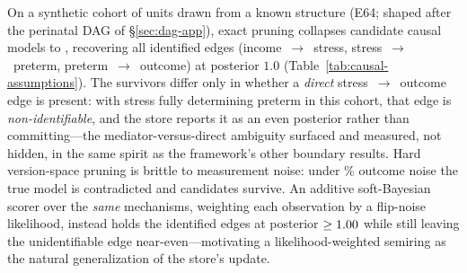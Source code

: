 On a synthetic cohort of \DagCleanCohort{} units drawn from a known structure
(E64; shaped after the perinatal DAG of \S\ref{sec:dag-app}), exact pruning
collapses \DagCandidateModels{} candidate causal models to \DagSurvivorsClean{},
recovering all \DagIdentifiedEdges{} identified edges
(income~$\to$~stress, stress~$\to$~preterm, preterm~$\to$~outcome) at posterior
$1.0$ (Table~\ref{tab:causal-assumptions}). The \DagSurvivorsClean{} survivors
differ only in whether a \emph{direct} stress~$\to$~outcome edge is present:
with stress fully determining preterm in this cohort, that edge is
\emph{non-identifiable}, and the store reports it as an even posterior rather
than committing---the mediator-versus-direct ambiguity surfaced and measured,
not hidden, in the same spirit as the framework's other boundary results. Hard
version-space pruning is brittle to measurement noise: under \DagNoiseFlipPct\%{}
outcome noise the true model is contradicted and \DagHardSurvivorsNoisy{}
candidates survive. An additive soft-Bayesian scorer over the \emph{same}
mechanisms, weighting each observation by a flip-noise likelihood, instead holds
the identified edges at posterior $\geq1.00{}$ while still
leaving the unidentifiable edge near-even---motivating a likelihood-weighted
semiring as the natural generalization of the store's update.

\begin{table}[htb]
\centering
\caption{\textbf{E64: testing causal assumptions on the many-worlds store.} Each
questioned edge of the perinatal DAG is a parameter; exact version-space pruning
on clean data pins the identified edges to their true value and leaves the
non-identifiable direct edge even, while a soft-Bayesian scorer over the same
mechanisms recovers the identified edges under \DagNoiseFlipPct\%{} outcome noise.}
\label{tab:causal-assumptions}

\end{table}


